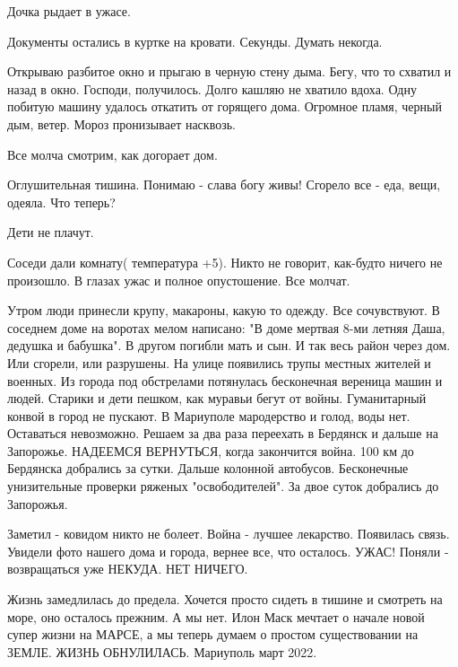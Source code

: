 Дочка рыдает в ужасе.

Документы остались в куртке на кровати. Секунды. Думать некогда.

Открываю разбитое окно и прыгаю в черную стену дыма. Бегу, что то схватил и
назад в окно. Господи, получилось. Долго кашляю не хватило вдоха. Одну побитую
машину удалось откатить от горящего дома. Огромное пламя, черный дым, ветер.
Мороз пронизывает насквозь.

Все молча смотрим, как догорает дом.

Оглушительная тишина. Понимаю - слава богу живы! Сгорело все - еда, вещи,
одеяла. Что теперь?

Дети не плачут. 

Соседи дали комнату( температура +5). Никто не говорит, как-будто ничего не
произошло. В глазах ужас и полное опустошение. Все молчат.

Утром люди принесли крупу, макароны, какую то одежду. Все сочувствуют. В
соседнем доме на воротах мелом написано: "В доме мертвая 8-ми летняя Даша,
дедушка и бабушка". В другом погибли мать и сын. И так весь район через дом.
Или сгорели, или разрушены. На улице появились трупы местных жителей и военных.
Из города под обстрелами потянулась бесконечная вереница машин и людей. Старики
и дети пешком, как муравьи бегут от войны. Гуманитарный конвой в город не
пускают. В Мариуполе мародерство и голод, воды нет. Оставаться невозможно.
Решаем за два раза переехать в Бердянск и дальше на Запорожье. НАДЕЕМСЯ
ВЕРНУТЬСЯ, когда закончится война. 100 км до Бердянска добрались за сутки.
Дальше колонной автобусов. Бесконечные унизительные проверки ряженых
"освободителей". За двое суток добрались до Запорожья. 

Заметил - ковидом никто не болеет. Война - лучшее лекарство. Появилась связь.
Увидели фото нашего дома и города, вернее все, что осталось. УЖАС! Поняли -
возвращаться уже НЕКУДА. НЕТ НИЧЕГО.

Жизнь замедлилась до предела. Хочется просто сидеть в тишине и смотреть на
море, оно осталось прежним. А мы нет. Илон Маск мечтает о начале новой супер
жизни на МАРСЕ, а мы теперь думаем о простом существовании на ЗЕМЛЕ. ЖИЗНЬ
ОБНУЛИЛАСЬ. Мариуполь март 2022.
